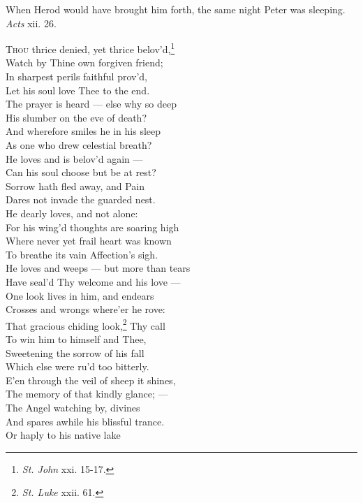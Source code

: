 
When Herod would have brought him forth, the same night Peter was sleeping. \emph{Acts} xii. 26.

\textsc{Thou} thrice denied, yet thrice belov’d,\footnote{\emph{St. John} xxi. 15-17.} \\
 Watch by Thine own forgiven friend; \\
 In sharpest perils faithful prov’d, \\
 Let his soul love Thee to the end. \\
  The prayer is heard — else why so deep \\
 His slumber on the eve of death? \\
 And wherefore smiles he in his sleep \\
 As one who drew celestial breath? \\
  He loves and is belov’d again — \\
 Can his soul choose but be at rest? \\
 Sorrow hath fled away, and Pain \\
 Dares not invade the guarded nest. \\
  He dearly loves, and not alone: \\
 For his wing’d thoughts are soaring high \\
 Where never yet frail heart was known \\
 To breathe its vain Affection’s sigh. \\
  He loves and weeps — but more than tears \\
 Have seal’d Thy welcome and his love — \\
 One look lives in him, and endears \\
 Crosses and wrongs where’er he rove: \\
  That gracious chiding look,\footnote{\emph{St. Luke} xxii. 61.} Thy call \\
 To win him to himself and Thee, \\
 Sweetening the sorrow of his fall \\
 Which else were ru’d too bitterly. \\
  E’en through the veil of sheep it shines, \\
 The memory of that kindly glance; — \\
 The Angel watching by, divines \\
 And spares awhile his blissful trance. \\
  Or haply to his native lake \\
